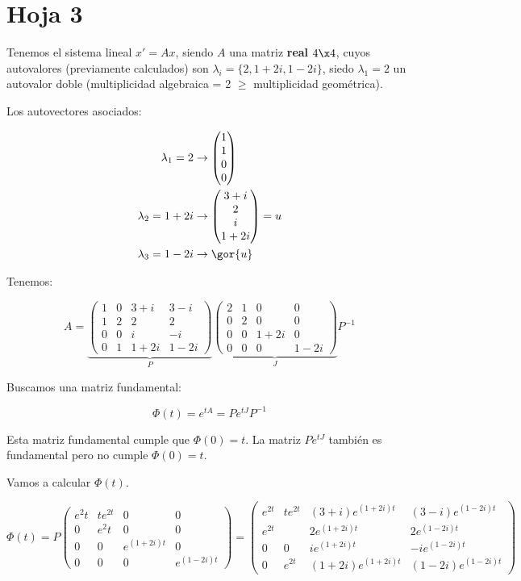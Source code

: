 \documentclass[nochap]{apuntes}
\begin{document}
\section{Hoja 3}

Tenemos el sistema lineal $x'=Ax$, siendo $A$ una matriz \textbf{real} $4\x4$, cuyos autovalores (previamente calculados) son $\lambda_i = \{2,1+2i,1-2i\}$, siedo $\lambda_1 = 2$ un autovalor doble (multiplicidad algebraica = 2 $\ge$ multiplicidad geométrica).

Los autovectores asociados: 

\begin{align*}
\lambda_1=2 & \to \begin{pmatrix}
1\\1\\0\\0
\end{pmatrix}\\
\lambda_2 = 1+2i & \to \begin{pmatrix}
3+i\\2\\i\\1+2i
\end{pmatrix} = u\\
\lambda_3 = 1-2i & \to \gor{u}\\
\end{align*}

Tenemos:

\[A=\underbrace{\begin{pmatrix}
1&0&3+i&3-i\\
1&2&2&2\\
0&0&i&-i\\
0&1&1+2i&1-2i
\end{pmatrix}}_{P} 
\underbrace{\begin{pmatrix}
2 & 1 & 0 & 0\\
0 & 2 & 0 & 0\\
0 & 0 & 1+2i & 0\\
0 & 0 & 0 & 1-2i
\end{pmatrix}}_{J}P^{-1}\]

Buscamos una matriz fundamental:

\[\Phi(t) = e^{tA} = P e^{tJ}P^{-1}\]

Esta matriz fundamental cumple que $\Phi(0) = t$. La matriz $P e^{tJ}$ también es fundamental pero no cumple $\Phi(0) = t$.

Vamos a calcular $\Phi(t)$.

\[\Phi(t) = P\begin{pmatrix}
e^2t&te^{2t}&0&0\\
0&e^2t&0&0\\
0&0&e^{(1+2i)t}&0\\
0&0&0&e^{(1-2i)t}
\end{pmatrix} = \begin{pmatrix}
e^{2t} & te^{2t} & (3+i)e^{(1+2i)t} & (3-i)e^{(1-2i)t}\\
e^{2t} & & 2e^{(1+2i)t} & 2 e^{(1-2i)t}\\
0 & 0 & ie^{(1+2i)t} & -ie^{(1-2i)t}\\
0 & e^{2t} & (1+2i) e^{(1+2i)t} & (1-2i) e^{(1-2i)t}
\end{pmatrix}\]
\end{document}
